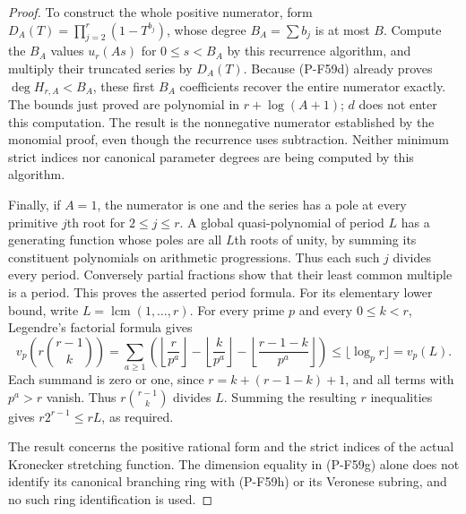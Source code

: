 \begin{proof}
To construct the whole positive numerator, form
$D_A(T)=\prod_{j=2}^{r}(1-T^{b_j})$, whose degree
$B_A=\sum b_j$ is at most $B$. Compute the $B_A$ values
$u_r(As)$ for $0\le s<B_A$ by this recurrence algorithm,
and multiply their truncated series by $D_A(T)$.
Because (P-F59d) already proves $\deg H_{r,A}<B_A$, these
first $B_A$ coefficients recover the entire numerator
exactly. The bounds just proved are polynomial in
$r+\log(A+1)$; $d$ does not enter this computation.
The result is the nonnegative numerator established by the
monomial proof, even though the recurrence uses subtraction.
Neither minimum strict indices nor canonical parameter degrees
are being computed by this algorithm.

Finally, if $A=1$, the numerator is one and the series has
a pole at every primitive $j$th root for $2\le j\le r$.
A global quasi-polynomial of period $L$ has a generating
function whose poles are all $L$th roots of unity, by summing
its constituent polynomials on arithmetic progressions.
Thus each such $j$ divides every period. Conversely partial
fractions show that their least common multiple is a period.
This proves the asserted period formula. For its elementary
lower bound, write
$L=\operatorname{lcm}(1,\ldots,r)$. For every prime $p$
and every $0\le k<r$, Legendre's factorial formula gives
\[
 v_p\!\left(r\binom{r-1}{k}\right)
  =\sum_{a\ge1}\left(
     \left\lfloor\frac r{p^a}\right\rfloor
    -\left\lfloor\frac k{p^a}\right\rfloor
    -\left\lfloor\frac{r-1-k}{p^a}\right\rfloor\right)
      \le\lfloor\log_p r\rfloor=v_p(L).
\]
Each summand is zero or one, since
$r=k+(r-1-k)+1$, and all terms with $p^a>r$ vanish.
Thus $r\binom{r-1}{k}$ divides $L$. Summing the resulting
$r$ inequalities gives $r2^{r-1}\le rL$, as required.

The result concerns the positive rational form and the
strict indices of the actual Kronecker
stretching function. The dimension equality in (P-F59g)
alone does not identify its canonical branching ring with
(P-F59h) or its Veronese subring, and no such ring
identification is used.
\end{proof}
